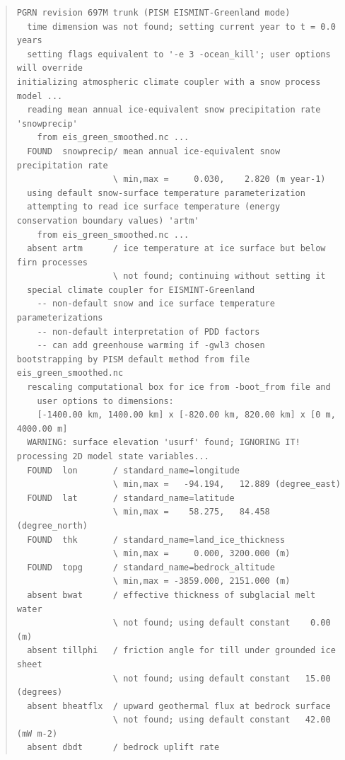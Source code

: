 \documentclass[11pt,final]{amsart}
\begin{document}
\begin{table}
\scriptsize
\begin{quote}
\begin{verbatim}
PGRN revision 697M trunk (PISM EISMINT-Greenland mode)
  time dimension was not found; setting current year to t = 0.0 years
  setting flags equivalent to '-e 3 -ocean_kill'; user options will override
initializing atmospheric climate coupler with a snow process model ...
  reading mean annual ice-equivalent snow precipitation rate 'snowprecip'
    from eis_green_smoothed.nc ... 
  FOUND  snowprecip/ mean annual ice-equivalent snow precipitation rate          
                   \ min,max =     0.030,    2.820 (m year-1)
  using default snow-surface temperature parameterization
  attempting to read ice surface temperature (energy conservation boundary values) 'artm'
    from eis_green_smoothed.nc ...
  absent artm      / ice temperature at ice surface but below firn processes     
                   \ not found; continuing without setting it
  special climate coupler for EISMINT-Greenland
    -- non-default snow and ice surface temperature parameterizations
    -- non-default interpretation of PDD factors
    -- can add greenhouse warming if -gwl3 chosen
bootstrapping by PISM default method from file eis_green_smoothed.nc
  rescaling computational box for ice from -boot_from file and
    user options to dimensions:
    [-1400.00 km, 1400.00 km] x [-820.00 km, 820.00 km] x [0 m, 4000.00 m]
  WARNING: surface elevation 'usurf' found; IGNORING IT!
processing 2D model state variables...
  FOUND  lon       / standard_name=longitude
                   \ min,max =   -94.194,   12.889 (degree_east)
  FOUND  lat       / standard_name=latitude          
                   \ min,max =    58.275,   84.458 (degree_north)
  FOUND  thk       / standard_name=land_ice_thickness                                          
                   \ min,max =     0.000, 3200.000 (m)
  FOUND  topg      / standard_name=bedrock_altitude                                            
                   \ min,max = -3859.000, 2151.000 (m)
  absent bwat      / effective thickness of subglacial melt water                
                   \ not found; using default constant    0.00 (m)
  absent tillphi   / friction angle for till under grounded ice sheet            
                   \ not found; using default constant   15.00 (degrees)
  absent bheatflx  / upward geothermal flux at bedrock surface                   
                   \ not found; using default constant   42.00 (mW m-2)
  absent dbdt      / bedrock uplift rate                                         

\end{verbatim}
\end{quote}
\end{table}
\end{document}
